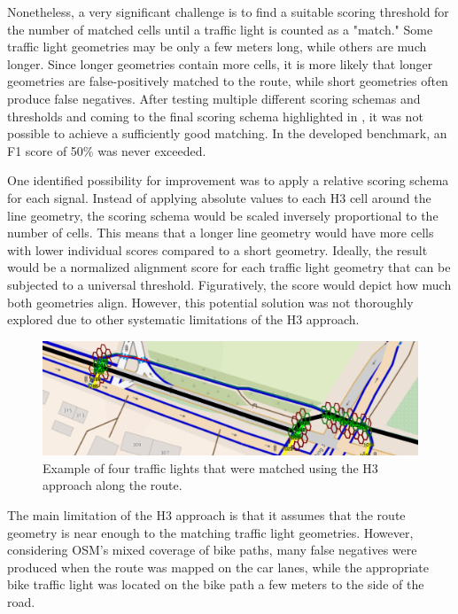 Nonetheless, a very significant challenge is to find a suitable scoring threshold for the number of matched cells until a traffic light is counted as a "match." Some traffic light geometries may be only a few meters long, while others are much longer. Since longer geometries contain more cells, it is more likely that longer geometries are false-positively matched to the route, while short geometries often produce false negatives. After testing multiple different scoring schemas and thresholds and coming to the final scoring schema highlighted in , it was not possible to achieve a sufficiently good matching. In the developed benchmark, an F1 score of 50\% was never exceeded. 

One identified possibility for improvement was to apply a relative scoring schema for each signal. Instead of applying absolute values to each H3 cell around the line geometry, the scoring schema would be scaled inversely proportional to the number of cells. This means that a longer line geometry would have more cells with lower individual scores compared to a short geometry. Ideally, the result would be a normalized alignment score for each traffic light geometry that can be subjected to a universal threshold. Figuratively, the score would depict how much both geometries align. However, this potential solution was not thoroughly explored due to other systematic limitations of the H3 approach.

\begin{figure}[htbp]
\centering
\includegraphics[width=\linewidth]{images/sg-selection-h3-example.png}
\caption{Example of four traffic lights that were matched using the H3 approach along the route.}
\label{fig:sg-selection-h3-example}
\end{figure}

The main limitation of the H3 approach is that it assumes that the route geometry is near enough to the matching traffic light geometries. However, considering OSM's mixed coverage of bike paths, many false negatives were produced when the route was mapped on the car lanes, while the appropriate bike traffic light was located on the bike path a few meters to the side of the road. 

